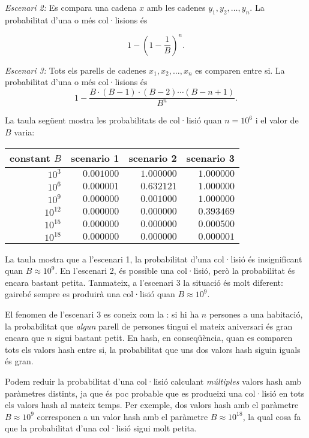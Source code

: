 \textit{Escenari 2:} Es compara una cadena $x$ amb les cadenes
$y_1,y_2,\ldots,y_n$. La probabilitat d'una o més col·lisions és


\[1-(1-\frac{1}{B})^n.\]


\textit{Escenari 3:} Tots els parells de cadenes $x_1,x_2,\ldots,x_n$
es comparen entre si. La probabilitat d'una o més col·lisions és
\[ 1 - \frac{B \cdot (B-1) \cdot (B-2) \cdots (B-n+1)}{B^n}.\]


La taula següent mostra les probabilitats de col·lisió quan $n=10^6$ i
el valor de $B$ varia:


\begin{center}
\begin{tabular}{rrrr}
constant $B$ & scenario 1 & scenario 2 & scenario 3 \\
\hline
$10^3$ & $0.001000$ & $1.000000$ & $1.000000$ \\
$10^6$ & $0.000001$ & $0.632121$ & $1.000000$ \\
$10^9$ & $0.000000$ & $0.001000$ & $1.000000$ \\
$10^{12}$ & $0.000000$ & $0.000000$ & $0.393469$ \\
$10^{15}$ & $0.000000$ & $0.000000$ & $0.000500$ \\
$10^{18}$ & $0.000000$ & $0.000000$ & $0.000001$ \\
\end{tabular}
\end{center}

La taula mostra que a l'escenari 1, la probabilitat d'una col·lisió és
insignificant quan $B \approx 10^9$. En l'escenari 2, és possible una
col·lisió, però la probabilitat és encara bastant petita. Tanmateix, a
l'escenari 3 la situació és molt diferent: gairebé sempre es produirà
una col·lisió quan $B \approx 10^9$.


El fenomen de l'escenari 3 es coneix com la : si hi ha $n$ persones a una habitació, la
probabilitat que \emph{algun} parell de persones tingui el mateix
aniversari és gran encara que $n$ sigui bastant petit. En hash, en
conseqüència, quan es comparen tots els valors hash entre si, la
probabilitat que uns dos valors hash siguin iguals és gran.

Podem reduir la probabilitat d'una col·lisió calculant
\emph{múltiples} valors hash amb paràmetres distints, ja que és poc
probable que es produeixi una col·lisió en tots els valors hash al
mateix temps. Per exemple, dos valors hash amb el paràmetre $B \approx
10^9$ corresponen a un valor hash amb el paràmetre $B \approx
10^{18}$, la qual cosa fa que la probabilitat d'una col·lisió sigui
molt petita.

